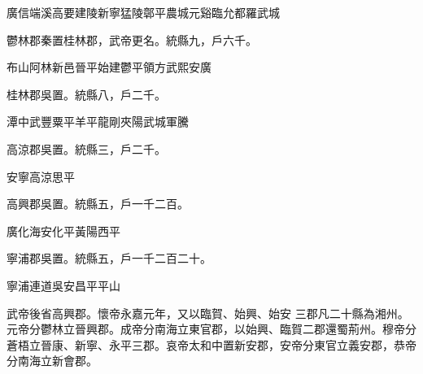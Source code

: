\begin{pinyinscope}
 廣信端溪高要建陵新寧猛陵鄣平農城元谿臨允都羅武城



 鬱林郡秦置桂林郡，武帝更名。統縣九，戶六千。



 布山阿林新邑晉平始建鬱平領方武熙安廣



 桂林郡吳置。統縣八，戶二千。



 潭中武豐粟平羊平龍剛夾陽武城軍騰



 高涼郡吳置。統縣三，戶二千。



 安寧高涼思平



 高興郡吳置。統縣五，戶一千二百。



 廣化海安化平黃陽西平



 寧浦郡吳置。統縣五，戶一千二百二十。



 寧浦連道吳安昌平平山



 武帝後省高興郡。懷帝永嘉元年，又以臨賀、始興、始安
 三郡凡二十縣為湘州。元帝分鬱林立晉興郡。成帝分南海立東官郡，以始興、臨賀二郡還蜀荊州。穆帝分蒼梧立晉康、新寧、永平三郡。哀帝太和中置新安郡，安帝分東官立義安郡，恭帝分南海立新會郡。



\end{pinyinscope}